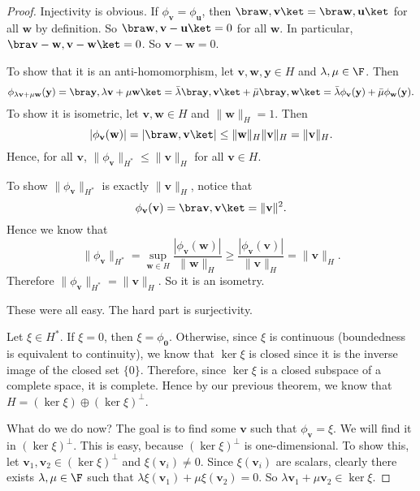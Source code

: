 \documentclass[a4paper]{article}
\begin{document}
\begin{proof}
  Injectivity is obvious. If $\phi_{\mathbf{v}} = \phi_{\mathbf{u}}$, then $\bra \mathbf{w}, \mathbf{v}\ket = \bra \mathbf{w}, \mathbf{u}\ket$ for all $\mathbf{w}$ by definition. So $\bra \mathbf{w}, \mathbf{v} - \mathbf{u}\ket = 0$ for all $\mathbf{w}$. In particular, $\bra \mathbf{v} - \mathbf{w}, \mathbf{v} - \mathbf{w}\ket = 0$. So $\mathbf{v} - \mathbf{w} = 0$.

  To show that it is an anti-homomorphism, let $\mathbf{v}, \mathbf{w}, \mathbf{y} \in H$ and $\lambda, \mu \in \F$. Then
  \[
    \phi_{\lambda\mathbf{v} + \mu \mathbf{w}}(\mathbf{y}) = \bra \mathbf{y}, \lambda \mathbf{v} + \mu \mathbf{w}\ket = \bar{\lambda} \bra \mathbf{y}, \mathbf{v}\ket + \bar{\mu}\bra \mathbf{y}, \mathbf{w}\ket = \bar{\lambda} \phi_{\mathbf{v}}(\mathbf{y}) + \bar{\mu} \phi_{\mathbf{w}} (\mathbf{y}).
  \]
  To show it is isometric, let $\mathbf{v}, \mathbf{w} \in H$ and $\|\mathbf{w}\|_H = 1$. Then
  \[
    |\phi_\mathbf{v}(\mathbf{w})| = |\bra \mathbf{w}, \mathbf{v}\ket| \leq \|\mathbf{w}\|_H \|\mathbf{v}\|_H = \|\mathbf{v}\|_H.
  \]
  Hence, for all $\mathbf{v}$, $\|\phi_\mathbf{v}\|_{H^*} \leq \|\mathbf{v}\|_H$ for all $\mathbf{v} \in H$.

  To show $\|\phi_\mathbf{v}\|_{H^*}$ is exactly $\|\mathbf{v}\|_H$, notice that
  \[
    \phi_\mathbf{v}(\mathbf{v}) = \bra \mathbf{v}, \mathbf{v}\ket = \|\mathbf{v}\|^2.
  \]
  Hence we know that
  \[
    \|\phi_\mathbf{v}\|_{H^*} = \sup_{\mathbf{w} \in H} \frac{|\phi_{\mathbf{v}}(\mathbf{w})|}{\|\mathbf{w}\|_H} \geq \frac{|\phi_{\mathbf{v}}(\mathbf{v})|}{\|\mathbf{v}\|_H} = \|\mathbf{v}\|_H.
  \]
  Therefore $\|\phi_{\mathbf{v}}\|_{H^*} = \|\mathbf{v}\|_H$. So it is an isometry.

  These were all easy. The hard part is surjectivity.

  Let $\xi \in H^*$. If $\xi = 0$, then $\xi = \phi_{\mathbf{0}}$. Otherwise, since $\xi$ is continuous (boundedness is equivalent to continuity), we know that $\ker \xi$ is closed since it is the inverse image of the closed set $\{0\}$. Therefore, since $\ker \xi$ is a closed subspace of a complete space, it is complete. Hence by our previous theorem, we know that $H = (\ker \xi) \oplus (\ker \xi)^\perp$.

  What do we do now? The goal is to find some $\mathbf{v}$ such that $\phi_{\mathbf{v}} = \xi$. We will find it in $(\ker \xi)^\perp$. This is easy, because $(\ker \xi)^\perp$ is one-dimensional. To show this, let $\mathbf{v}_1, \mathbf{v}_2 \in (\ker \xi)^\perp$ and $\xi(\mathbf{v}_i) \not= 0$. Since $\xi(\mathbf{v}_i)$ are scalars, clearly there exists $\lambda, \mu \in \F$ such that $\lambda \xi(\mathbf{v}_1) + \mu \xi(\mathbf{v}_2) = 0$. So $\lambda \mathbf{v}_1 + \mu \mathbf{v}_2 \in \ker \xi$.


\end{proof}
\end{document}
